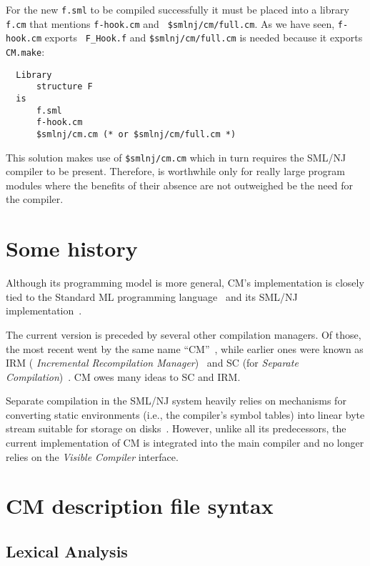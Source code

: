 \documentclass[titlepage,letterpaper]{article}
\begin{document}
For the new {\tt f.sml} to be compiled successfully it must be placed
into a library {\tt f.cm} that mentions {\tt f-hook.cm} and {\tt
\$smlnj/cm/full.cm}.  As we have seen, {\tt f-hook.cm} exports {\tt
F\_Hook.f} and {\tt \$smlnj/cm/full.cm} is needed because it exports
{\tt CM.make}:

\begin{verbatim}
  Library
      structure F
  is
      f.sml
      f-hook.cm
      $smlnj/cm.cm (* or $smlnj/cm/full.cm *)
\end{verbatim}

  This solution makes use of {\tt \$smlnj/cm.cm}
which in turn requires the SML/NJ compiler to be present.  Therefore,
is worthwhile only for really large program modules where the benefits
of their absence are not outweighed be the need for the compiler.

\section{Some history}

Although its programming model is more general, CM's implementation is
closely tied to the Standard ML programming language~\cite{milner97}
and its SML/NJ implementation~\cite{appel91:sml}.

The current version is preceded by several other compilation managers.
Of those, the most recent went by the same name
``CM''~\cite{blume95:cm}, while earlier ones were known as IRM ({\it
Incremental Recompilation Manager})~\cite{harper94:irm} and SC (for
{\it Separate Compilation})~\cite{harper-lee-pfenning-rollins-CM}.  CM
owes many ideas to SC and IRM.

Separate compilation in the SML/NJ system heavily relies on mechanisms
for converting static environments (i.e., the compiler's symbol
tables) into linear byte stream suitable for storage on
disks~\cite{appel94:sepcomp}.  However, unlike all its predecessors,
the current implementation of CM is integrated into the main compiler
and no longer relies on the {\em Visible Compiler} interface.

\pagebreak

\appendix

\section{CM description file syntax}

\subsection{Lexical Analysis}
\end{document}
